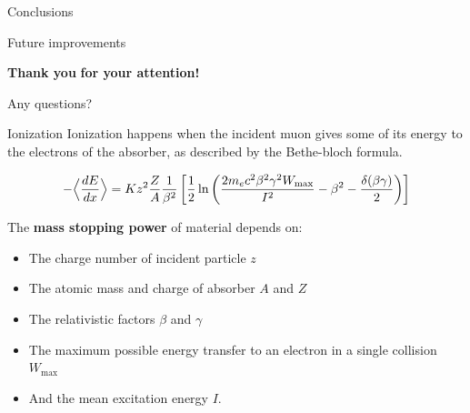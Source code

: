 \documentclass[8 pt]{beamer}
\newcommand{\backupbegin}{
   \newcounter{finalframe}
   \setcounter{finalframe}{\value{framenumber}}
}
\begin{document}
\begin{frame}{Conclusions}

\end{frame}

\begin{frame}{Future improvements}

\end{frame}










\begin{frame}{}
	\centering
	\huge{\textbf{\color{mycolor} Thank you  \color{black}}} \newline
	\LARGE{\textbf{\color{mycolor} for your attention! \color{black}}} \vfill

	Any questions? \vfill
\end{frame}

\appendix
	\backupbegin
	
\begin{frame}{Ionization}
\justifying
Ionization happens when the  incident muon gives some of its energy to the electrons of the absorber, as described by the Bethe-bloch formula. \vfill

\begin{equation*}
\label{eq:BB}
- \Bigl \langle \frac{dE}{dx} \Bigr \rangle = K z^2 \frac{Z}{A} \frac{1}{\beta^2} \left [\frac{1}{2} \ln \left (\frac{2 m_e c^2 \beta^2 \gamma^2 W_{\text{max}}}{I^2} - \beta^2 - \frac{\delta(\beta \gamma)}{2} \right ) \right ]
\end{equation*} \vfill

The \textbf{mass stopping power} of material depends on:
\begin{itemize}
	\item The charge number of incident particle $z$
	\item The atomic mass and charge of absorber $A$ and $Z$
	\item The relativistic factors $\beta$ and $\gamma$
	\item The maximum possible energy transfer to an electron in a single collision $W_{\text{max}}$
	\item And the mean excitation energy $I$.
\end{itemize} \vfill
\end{frame}
\end{document}

